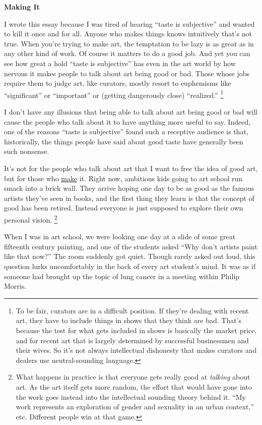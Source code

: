 \documentclass[12pt]{book}
\begin{document}
\textbf{Making It}

I wrote this essay because I was tired of hearing ``taste is
subjective'' and wanted to kill it once and for all. Anyone who makes
things knows intuitively that's not true. When you're trying to make
art, the temptation to be lazy is as great as in any other kind of work.
Of course it matters to do a good job. And yet you can see how great a
hold ``taste is subjective'' has even in the art world by how nervous it
makes people to talk about art being good or bad. Those whose jobs
require them to judge art, like curators, mostly resort to euphemisms
like ``significant'' or ``important'' or (getting dangerously close)
``realized.'' \footnote{To be fair, curators are in a difficult position. If they're
dealing with recent art, they have to include things in shows that they
think are bad. That's because the test for what gets included in shows
is basically the market price, and for recent art that is largely
determined by successful businessmen and their wives. So it's not always
intellectual dishonesty that makes curators and dealers use
neutral-sounding language.}

I don't have any illusions that being able to talk about art being good
or bad will cause the people who talk about it to have anything more
useful to say. Indeed, one of the reasons ``taste is subjective'' found
such a receptive audience is that, historically, the things people have
said about good taste have generally been such nonsense.

It's not for the people who talk about art that I want to free the idea
of good art, but for those who \href{taste.html}{make} it. Right now,
ambitious kids going to art school run smack into a brick wall. They
arrive hoping one day to be as good as the famous artists they've seen
in books, and the first thing they learn is that the concept of good has
been retired. Instead everyone is just supposed to explore their own
personal vision. \footnote{What happens in practice is that everyone gets really good at
\emph{talking} about art. As the art itself gets more random, the effort
that would have gone into the work goes instead into the intellectual
sounding theory behind it. ``My work represents an exploration of gender
and sexuality in an urban context,'' etc. Different people win at that
game.}

When I was in art school, we were looking one day at a slide of some
great fifteenth century painting, and one of the students asked ``Why
don't artists paint like that now?'' The room suddenly got quiet. Though
rarely asked out loud, this question lurks uncomfortably in the back of
every art student's mind. It was as if someone had brought up the topic
of lung cancer in a meeting within Philip Morris.
\end{document}
